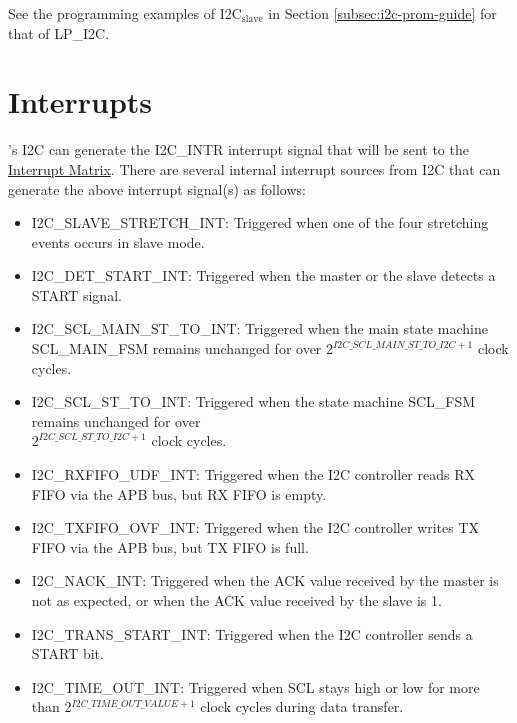 \documentclass[main\_\_EN.tex]{subfiles}
\begin{document}
See the programming examples of \chipname{} I2C$_\text{slave}$ in Section \ref{subsec:i2c-prom-guide} for that of LP\_I2C.


\section{Interrupts}
\label{sub:i2c-int}

\chipname{}'s I2C can generate the I2C\_INTR interrupt signal that will be sent to the \hyperref[mod:intmtrx]{Interrupt Matrix}. There are several internal interrupt sources from I2C that can generate the above interrupt signal(s) as follows:

\begin{itemize}
\item \label{int:i2c-slave-stretch}I2C\_SLAVE\_STRETCH\_INT: Triggered when one of the four stretching events occurs in slave mode.
\item \label{int:i2c-start}I2C\_DET\_START\_INT: Triggered when the master or the slave detects a START signal.
\item \label{int:i2c-scl-main-fsm}I2C\_SCL\_MAIN\_ST\_TO\_INT: Triggered when the main state machine SCL\_MAIN\_FSM remains unchanged for over \(2^{\hyperref[fielddesc:I2CSCLMAINSTTOI2C]{I2C\_SCL\_MAIN\_ST\_TO\_I2C}+1}\) clock cycles.
\item \label{int:i2c-scl-fsm}I2C\_SCL\_ST\_TO\_INT: Triggered when the state machine SCL\_FSM remains unchanged for over \\\(2^{\hyperref[fielddesc:I2CSCLSTTOI2C]{I2C\_SCL\_ST\_TO\_I2C}+1}\) clock cycles.
\item \label{int:i2c-rxfifo-udf}I2C\_RXFIFO\_UDF\_INT: Triggered when the I2C controller reads RX FIFO via the APB bus, but RX FIFO is empty.
\item \label{int:i2c-txfifo-ovf}I2C\_TXFIFO\_OVF\_INT: Triggered when the I2C controller writes TX FIFO via the APB bus, but TX FIFO is full.
\item \label{int:i2c-nack}I2C\_NACK\_INT: Triggered when the ACK value received by the master is not as expected, or when the ACK value received by the slave is 1.
\item \label{int:i2c-trans-start}I2C\_TRANS\_START\_INT: Triggered when the I2C controller sends a START bit.
\item \label{int:i2c-time-out}I2C\_TIME\_OUT\_INT: Triggered when SCL stays high or low for more than 2$^{\hyperref[fielddesc:I2CTIMEOUTVALUE]{I2C\_TIME\_OUT\_VALUE}+1}$ clock cycles during data transfer.

\end{itemize}
\end{document}
